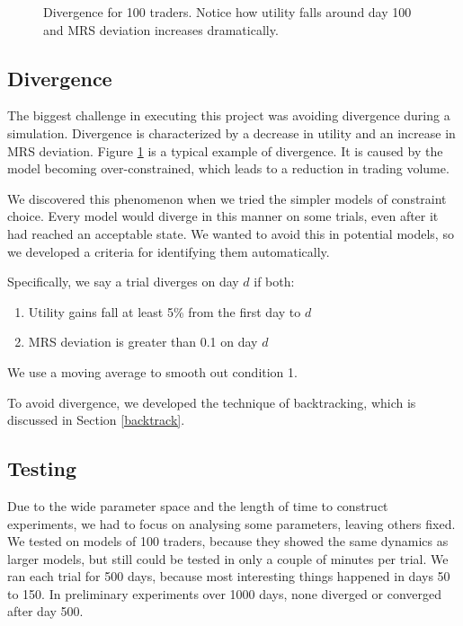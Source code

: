 \documentclass[12pt,a4paper,titlepage]{article}
\begin{document}
\begin{figure}[H]
    \centering
    
    \caption{
      Divergence for 100 traders.
      Notice how utility falls around day 100 and MRS deviation increases dramatically.
    }
    \label{fig:div}
\end{figure}

\subsection{Divergence}
The biggest challenge in executing this project was avoiding divergence during a simulation.
Divergence is characterized by a decrease in utility and an increase in MRS deviation.
Figure \ref{fig:div} is a typical example of divergence. 
It is caused by the model becoming over-constrained, which leads to a reduction in trading volume.


We discovered this phenomenon when we tried the simpler models of constraint choice.
Every model would diverge in this manner on some trials, even after it had reached an acceptable state.
We wanted to avoid this in potential models, so we developed a criteria for identifying them automatically.

Specifically, we say a trial diverges on day $d$ if both:
\begin{enumerate}
  \item Utility gains fall at least 5\% from the first day to $d$ 
  \item MRS deviation is greater than 0.1 on day $d$
\end{enumerate}
We use a moving average to smooth out condition 1.
    
To avoid divergence, we developed the technique of backtracking, which is discussed in Section \ref{backtrack}.

\subsection{Testing}
Due to the wide parameter space and the length of time to construct experiments, we had to focus on analysing some parameters, leaving others fixed.
We tested on models of 100 traders, because they showed the same dynamics as larger models, but still could be tested in only a couple of minutes per trial.
We ran each trial for 500 days, because most interesting things happened in days 50 to 150.
In preliminary experiments over 1000 days, none diverged or converged after day 500.
\end{document}
